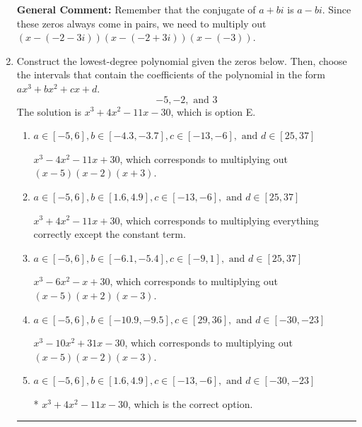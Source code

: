 \documentclass{extbook}[14pt]
\newcommand{\litem}[1]{\item #1

\rule{\textwidth}{0.4pt}}
\begin{document}
\begin{enumerate}
{\textbf{General Comment:} Remember that the conjugate of $a+bi$ is $a-bi$. Since these zeros always come in pairs, we need to multiply out $(x-(-2 - 3 i))(x-(-2 + 3 i))(x-(-3))$.
}
\litem{
Construct the lowest-degree polynomial given the zeros below. Then, choose the intervals that contain the coefficients of the polynomial in the form $ax^3+bx^2+cx+d$.
\[ -5, -2, \text{ and } 3 \]The solution is \( x^{3} +4 x^{2} -11 x -30 \), which is option E.\begin{enumerate}[label=\Alph*.]
\item \( a \in [-5, 6], b \in [-4.3, -3.7], c \in [-13, -6], \text{ and } d \in [25, 37] \)

$x^{3} -4 x^{2} -11 x + 30$, which corresponds to multiplying out $(x -5)(x -2)(x + 3)$.
\item \( a \in [-5, 6], b \in [1.6, 4.9], c \in [-13, -6], \text{ and } d \in [25, 37] \)

$x^{3} +4 x^{2} -11 x + 30$, which corresponds to multiplying everything correctly except the constant term.
\item \( a \in [-5, 6], b \in [-6.1, -5.4], c \in [-9, 1], \text{ and } d \in [25, 37] \)

$x^{3} -6 x^{2} -x + 30$, which corresponds to multiplying out $(x -5)(x + 2)(x -3)$.
\item \( a \in [-5, 6], b \in [-10.9, -9.5], c \in [29, 36], \text{ and } d \in [-30, -23] \)

$x^{3} -10 x^{2} +31 x -30$, which corresponds to multiplying out $(x -5)(x -2)(x -3)$.
\item \( a \in [-5, 6], b \in [1.6, 4.9], c \in [-13, -6], \text{ and } d \in [-30, -23] \)

* $x^{3} +4 x^{2} -11 x -30$, which is the correct option.
\end{enumerate}

}
\end{enumerate}
\end{document}
